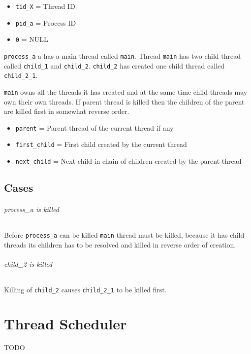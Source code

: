 \begin{itemize}
  \item \verb+tid_X+ = Thread ID
  \item \verb+pid_a+ = Process ID
  \item \verb+0+ = NULL
\end{itemize}

\verb+process_a+ a has a main thread called \verb+main+. Thread
\verb+main+ has two child thread called \verb+child_1+ and \verb+child_2+.
\verb+child_2+ has created one child thread called \verb+child_2_1+.

\verb+main+ owns all the threads it has created and at the same time child
threads may own their own threads. If parent thread is killed then the
children of the parent are killed first in somewhat reverse order.

\begin{itemize}
  \item \verb+parent+ = Parent thread of the current thread if any
  \item \verb+first_child+ = First child created by the current thread
  \item \verb+next_child+ = Next child in chain of children created by the
        parent thread
\end{itemize}

\section{Cases}
\subparagraph*{process\_a is killed}

Before \verb+process_a+ can be killed \verb+main+ thread must be killed,
because it has child threads its children has to be resolved and killed in
reverse order of creation.

\subparagraph*{child\_2 is killed}

Killing of \verb+child_2+ causes \verb+child_2_1+ to be killed first.


\chapter{Thread Scheduler}

TODO
